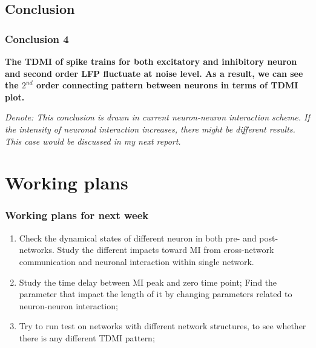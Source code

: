 \documentclass{beamer}
\begin{document}
	\subsection{Conclusion}
	\begin{frame}
	\frametitle{Conclusion 4}
	\textbf{The TDMI of spike trains for both excitatory and inhibitory neuron and second order LFP fluctuate at noise level. As a result, we can see the $2^{nd}$ order connecting pattern between neurons in terms of TDMI plot.}\par
	\emph{Denote: This conclusion is drawn in current neuron-neuron interaction scheme. If the intensity of neuronal interaction increases, there might be different results. This case would be discussed in my next report.}
	\end{frame}
	\section{Working plans}
	\begin{frame}
	\frametitle{Working plans for next week}
	\begin{enumerate}
		\item Check the dynamical states of different neuron in both pre- and post- networks. Study the different impacts toward MI from cross-network communication and neuronal interaction within single network.
		\item Study the time delay between MI peak and zero time point; Find the parameter that impact the length of it by changing parameters related to neuron-neuron interaction;
		\item Try to run test on networks with different network structures, to see whether there is any different TDMI pattern;
	\end{enumerate}
	\end{frame}
\end{document}
